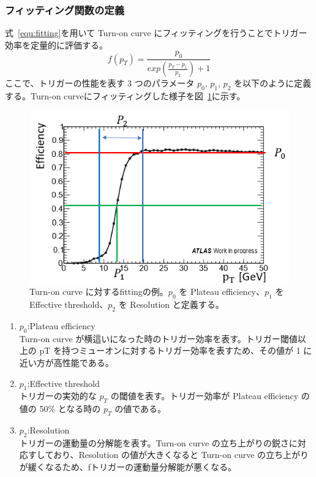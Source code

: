 \subsubsection{フィッティング関数の定義}\label{section:fitting}
式~\eqref{equ:fitting}を用いて Turn-on curve にフィッティングを行うことでトリガー効率を定量的に評価する。
\begin{equation}
    f(p_T) = \frac{p_0}{exp(\frac{p_T-p_1}{p_2})+1}
　\label{equ:fitting}
\end{equation}
ここで、トリガーの性能を表す 3 つのパラメータ $p_0$, $p_1$, $p_2$ を以下のように定義する。Turn-on curveにフィッティングした様子を図~\ref{fig:fiting}に示す。
\begin{figure}[tb]
  \centering
  \includegraphics[clip, width=12cm]{fig/4/fitting_def.png}
  \caption{Turn-on curve に対するfittingの例。$p_0$ を Plateau efficiency、$p_1$ を Effective threshold、$p_2$ を Resolution と定義する。}
  \label{fig:fiting}
\end{figure}

\begin{enumerate}\label{table:fitting}
   \item $p_0$:Plateau efficiency\\
   Turn-on curve が横這いになった時のトリガー効率を表す。トリガー閾値以上の pT を持つミューオンに対するトリガー効率を表すため、その値が 1 に近い方が高性能である。
   \item $p_1$:Effective threshold\\
   トリガーの実効的な $p_T$ の閾値を表す。トリガー効率が Plateau efficiency の値の 50\% となる時の $p_T$ の値である。
   \item $p_2$:Resolution\\
   トリガーの運動量の分解能を表す。Turn-on curve の立ち上がりの鋭さに対応すしており、Resolution の値が大きくなると Turn-on curve の立ち上がりが緩くなるため、fトリガーの運動量分解能が悪くなる。
\end{enumerate}

